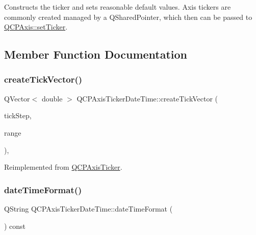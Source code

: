 Constructs the ticker and sets reasonable default values. Axis tickers are commonly created managed by a Q\+Shared\+Pointer, which then can be passed to \mbox{\hyperlink{class_q_c_p_axis_a4ee03fcd2c74d05cd1a419b9af5cfbdc}{Q\+C\+P\+Axis\+::set\+Ticker}}. 

\subsection{Member Function Documentation}
\mbox{\label{class_q_c_p_axis_ticker_date_time_a44c2c09a303d281801b69226e243047d}} 
\subsubsection{\texorpdfstring{createTickVector()}{createTickVector()}}
{\footnotesize\ttfamily Q\+Vector$<$ double $>$ Q\+C\+P\+Axis\+Ticker\+Date\+Time\+::create\+Tick\+Vector (\begin{DoxyParamCaption}\item[{double}]{tick\+Step,  }\item[{const \mbox{\hyperlink{class_q_c_p_range}{Q\+C\+P\+Range}} \&}]{range }\end{DoxyParamCaption})\hspace{0.3cm}{\ttfamily [protected]}, {\ttfamily [virtual]}}



Reimplemented from \mbox{\hyperlink{class_q_c_p_axis_ticker_af4645a824c7bd2ca8fc7e86ebf9055bd}{Q\+C\+P\+Axis\+Ticker}}.

\mbox{\label{class_q_c_p_axis_ticker_date_time_aac8e2bb32ca8ff1394c42d2d62390718}} 
\subsubsection{\texorpdfstring{dateTimeFormat()}{dateTimeFormat()}}
{\footnotesize\ttfamily Q\+String Q\+C\+P\+Axis\+Ticker\+Date\+Time\+::date\+Time\+Format (\begin{DoxyParamCaption}{ }\end{DoxyParamCaption}) const\hspace{0.3cm}{\ttfamily [inline]}}

